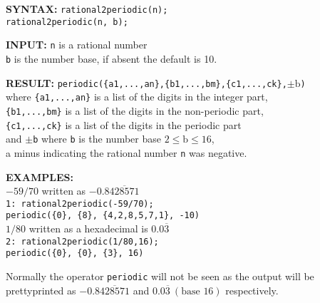 \begin{list}{}{
    \setlength{\leftmargin}{22mm}
    \setlength{\labelwidth}{\leftmargin}\addtolength{\labelwidth}{-\labelsep}
    \renewcommand{\makelabel}[1]{#1}
  }
\item[\textbf{SYNTAX:}]
  \texttt{rational2periodic(n);}\\
  \texttt{rational2periodic(n, b);}

\item[\textbf{INPUT:}]
  \texttt{n} \hspace{3mm} is a rational number\\
  \texttt{b} \hspace{3mm} is the number base, if absent the default is 10.

\item[\textbf{RESULT:}]
  \texttt{periodic(\{a1,...,an\},\{b1,...,bm\},\{c1,...,ck\},$\pm{\mathrm{b}}$)}\\
  where  \texttt{\{a1,...,an\}} is a list of the digits in the integer part,\\
  \texttt{\{b1,...,bm\}} is a list of the digits in the non-periodic part,\\
  \texttt{\{c1,...,ck\}} is a list of the digits in the periodic part\\
  and $\pm$\texttt{b} where \texttt{b} is the number base $2 \leq \mathrm{b} \leq 16$, \\
  a minus indicating the rational number \texttt{n} was negative.

\item[\textbf{EXAMPLES:}]\mbox{}\\
  $-59/70$ written as $-0.8\overline{428571}$\\
  \texttt{1: rational2periodic(-59/70);}\\
  \texttt{\hspace*{1em}periodic(\{0\}, \{8\}, \{4,2,8,5,7,1\}, -10)}\\[\baselineskip]
  $1/80$ written as a hexadecimal is $0.0\overline{3}$\\
  \texttt{2: rational2periodic(1/80,16);}\\
  \texttt{\hspace*{1em}periodic(\{0\}, \{0\}, \{3\}, 16)}
\end{list}

Normally the operator \texttt{periodic} will not be seen as the output
will be prettyprinted as $-0.8\overline{428571}$ and
$0.0\overline{3}\ (\mbox{base }16)$ respectively.

